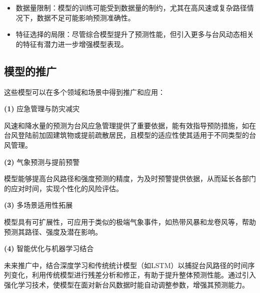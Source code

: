\documentclass[withoutpreface,bwprint]{cumcmthesis}
\begin{document}
\begin{itemize}[itemindent=2em]

\item 数据量限制：模型的训练可能受到数据量的制约，尤其在高风速或复杂路径情况下，数据不足可能影响预测准确性。

\item 特征选择的局限：尽管综合模型提升了预测性能，但引入更多与台风动态相关的特征有潜力进一步增强模型表现。

\end{itemize}

\subsection{模型的推广}

这些模型可以在多个领域和场景中得到推广和应用：

\textbf{(1)} 应急管理与防灾减灾

风速和降水量的预测为台风应急管理提供了重要依据，能有效指导预防措施，如在台风登陆前加固建筑物或提前疏散居民，且模型的适应性使其适用于不同类型的台风管理。

\textbf{(2)} 气象预测与提前预警

模型能够提高台风路径和强度预测的精度，为及时预警提供依据，从而延长各部门的应对时间，实现个性化的风险评估。

\textbf{(3)} 多场景适用性拓展

模型具有可扩展性，可应用于类似的极端气象事件，如热带风暴和龙卷风等，帮助预测其路径、强度及潜在影响。

\textbf{(4)} 智能优化与机器学习结合

未来推广中，结合深度学习和传统统计模型（如LSTM）以捕捉台风路径的时间序列变化，利用传统模型进行残差分析和修正，有助于提升整体预测性能。通过引入强化学习技术，使模型在面对新台风数据时能自动调整参数，增强其预测能力。

\newpage

\nocite{*}


% 

% 

% 
\end{document}
